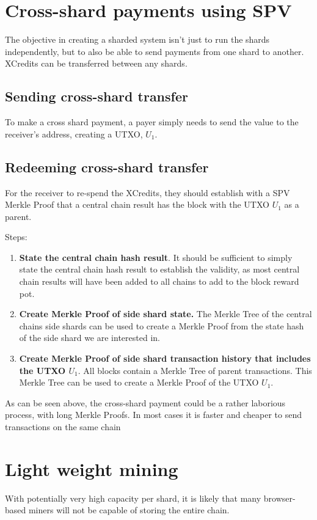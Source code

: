 \documentclass[a4paper,12pt]{article}
\begin{document}
\section{Cross-shard payments using SPV}
The objective in creating a sharded system isn't just to run the shards independently, but to also be able to send payments from one shard to another. XCredits can be transferred between any shards.

\subsection{Sending cross-shard transfer}
To make a cross shard payment, a payer simply needs to send the value to the receiver's address, creating a UTXO, $U_1$.

\subsection{Redeeming cross-shard transfer}
For the receiver to re-spend the XCredits, they should establish with a SPV Merkle Proof that a central chain result has the block with the UTXO $U_1$ as a parent. 

Steps:
\begin{enumerate}
  \item \textbf{State the central chain hash result}. It should be sufficient to simply state the central chain hash result to establish the validity, as most central chain results will have been added to all chains to add to the block reward pot. 
  \item \textbf{Create Merkle Proof of side shard state.}  The Merkle Tree of the central chains side shards can be used to create a Merkle Proof from the state hash of the side shard we are interested in. 
  \item \textbf{Create Merkle Proof of side shard transaction history that includes the UTXO $U_1$}. All blocks contain a Merkle Tree of parent transactions. This Merkle Tree can be used to create a Merkle Proof of the UTXO $U_1$.
\end{enumerate}


As can be seen above, the cross-shard payment could be a rather laborious process, with long Merkle Proofs. In most cases it is faster and cheaper to send transactions on the same chain 




\section{Light weight mining}
With potentially very high capacity per shard, it is likely that many browser-based miners will not be capable of storing the entire chain. 
\end{document}
